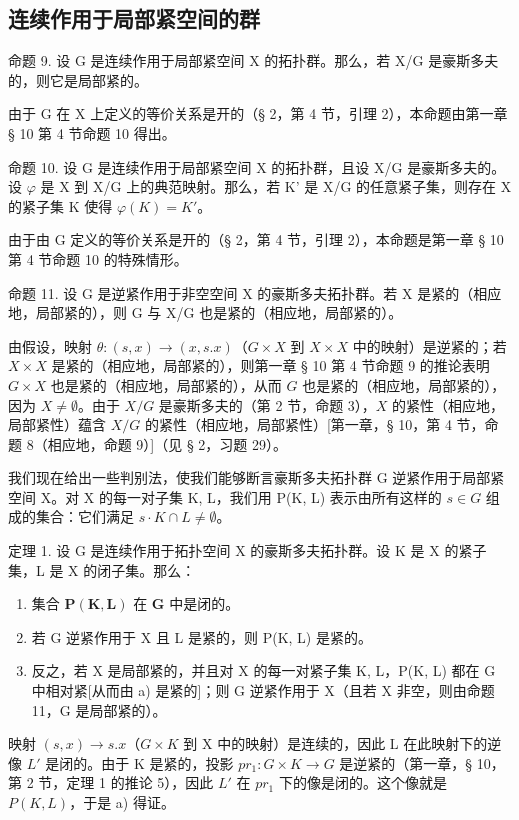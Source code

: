 \subsection{连续作用于局部紧空间的群}

命题 9. 设 G 是连续作用于局部紧空间 X 的拓扑群。那么，若 X/G 是豪斯多夫的，则它是局部紧的。

由于 G 在 X 上定义的等价关系是开的（§ 2，第 4 节，引理 2），本命题由第一章 § 10 第 4 节命题 10 得出。

命题 10. 设 G 是连续作用于局部紧空间 X 的拓扑群，且设 X/G 是豪斯多夫的。设 \(\varphi\) 是 X 到 X/G 上的典范映射。那么，若 K' 是 X/G 的任意紧子集，则存在 X 的紧子集 K 使得 \(\varphi(K) = K'\)。

由于由 G 定义的等价关系是开的（§ 2，第 4 节，引理 2），本命题是第一章 § 10 第 4 节命题 10 的特殊情形。

命题 11. 设 G 是逆紧作用于非空空间 X 的豪斯多夫拓扑群。若 X 是紧的（相应地，局部紧的），则 G 与 X/G 也是紧的（相应地，局部紧的）。

由假设，映射 \(\theta : (s, x) \to (x, s.x)\)（\(G \times X\) 到 \(X \times X\) 中的映射）是逆紧的；若 \(X \times X\) 是紧的（相应地，局部紧的），则第一章 § 10 第 4 节命题 9 的推论表明 \(G \times X\) 也是紧的（相应地，局部紧的），从而 \(G\) 也是紧的（相应地，局部紧的），因为 \(X \neq \emptyset\)。由于 \(X/G\) 是豪斯多夫的（第 2 节，命题 3），\(X\) 的紧性（相应地，局部紧性）蕴含 \(X/G\) 的紧性（相应地，局部紧性）{[}第一章，§ 10，第 4 节，命题 8（相应地，命题 9）{]}（见 § 2，习题 29）。

我们现在给出一些判别法，使我们能够断言豪斯多夫拓扑群 G 逆紧作用于局部紧空间 X。对 X 的每一对子集 K, L，我们用 P(K, L) 表示由所有这样的 \(s \in G\) 组成的集合：它们满足 \(s \cdot K \cap L \neq \emptyset\)。

定理 1. 设 G 是连续作用于拓扑空间 X 的豪斯多夫拓扑群。设 K 是 X 的紧子集，L 是 X 的闭子集。那么：

\begin{enumerate}
\def\labelenumi{\alph{enumi})}
\item
  集合 \(\mathbf{P}(\mathbf{K},\mathbf{L})\) 在 \(\mathbf{G}\) 中是闭的。
\item
  若 G 逆紧作用于 X 且 L 是紧的，则 P(K, L) 是紧的。
\item
  反之，若 X 是局部紧的，并且对 X 的每一对紧子集 K, L，P(K, L) 都在 G 中相对紧{[}从而由 a) 是紧的{]}；则 G 逆紧作用于 X（且若 X 非空，则由命题 11，G 是局部紧的）。
\end{enumerate}

映射 \((s, x) \to s.x\)（\(G \times K\) 到 X 中的映射）是连续的，因此 L 在此映射下的逆像 \(L'\) 是闭的。由于 K 是紧的，投影 \(pr_{1}: G \times K \to G\) 是逆紧的（第一章，§ 10，第 2 节，定理 1 的推论 5），因此 \(L'\) 在 \(pr_{1}\) 下的像是闭的。这个像就是 \(P(K, L)\)，于是 a) 得证。

